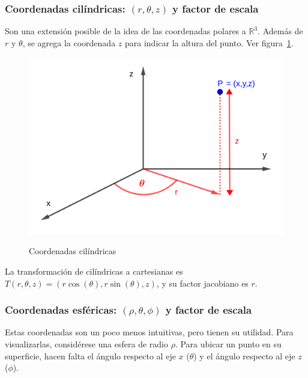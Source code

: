 \documentclass{article}
\renewcommand{\Bbb}{\mathbb}
\begin{document}
\subsubsection{Coordenadas cilíndricas: \texorpdfstring{$(r, \theta, z)$}{(r, theta, z)} y factor de escala}

Son una extensión posible de la idea de las coordenadas polares a $\Bbb R^3$. Además de $r$ y $\theta$, se agrega la coordenada $z$ para indicar la altura del punto. Ver figura~\ref{fig:ccil}.

\begin{figure}[ht]
\centering
\caption{Coordenadas cilíndricas}
\includegraphics[scale=0.8]{img/teo_fig031_ccil.png}
\label{fig:ccil}
\end{figure}

La transformación de cilíndricas a cartesianas es $T(r, \theta, z) = (r \cos(\theta), r \sin(\theta), z)$, y su factor jacobiano es $r$.

\subsubsection{Coordenadas esféricas: \texorpdfstring{$(\rho, \theta, \phi)$}{rho, theta, phi} y factor de escala}

Estas coordenadas son un poco menos intuitivas, pero tienen su utilidad. Para visualizarlas, considérese una esfera de radio $\rho$. Para ubicar un punto en su superficie, hacen falta el ángulo respecto al eje $x$ ($\theta$) y el ángulo respecto al eje $z$ ($\phi$).
\end{document}
